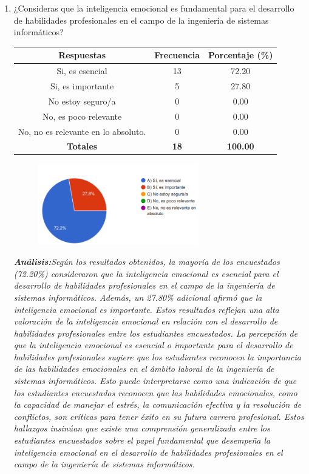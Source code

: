 \documentclass[journal]{IEEEtran}
\begin{document}
\begin{enumerate}
\item¿Consideras que la inteligencia emocional es fundamental para el desarrollo de habilidades profesionales en el campo de la ingeniería de sistemas informáticos?
	\begin{table}[H]
		\renewcommand{\arraystretch}{1.3}
		\centering
		\begin{tabular}{|c|c|c|}
			\hline
			\textbf{Respuestas} & \textbf{Frecuencia} & \textbf{Porcentaje (\%)}\\
			\hline
			Si, es esencial & 13 & 72.20 \\
			Si, es importante & 5 & 27.80 \\
			No estoy seguro/a & 0 & 0.00\\
			No, es poco relevante & 0 & 0.00\\
			No, no es relevante en lo absoluto. & 0 & 0.00\\
			\hline
			\textbf{Totales} &\textbf{18}& \textbf{100.00}\\
			\hline
		\end{tabular}
	\end{table}
	\begin{figure}[h]
		\centering
		\includegraphics[width=07cm]{Pregunta 4}
	\end{figure}
	\textit{\textbf{Análisis:}Según los resultados obtenidos, la mayoría de los encuestados (72.20\%) consideraron que la inteligencia emocional es esencial para el desarrollo de habilidades profesionales en el campo de la ingeniería de sistemas informáticos. Además, un 27.80\% adicional afirmó que la inteligencia emocional es importante. Estos resultados reflejan una alta valoración de la inteligencia emocional en relación con el desarrollo de habilidades profesionales entre los estudiantes encuestados.
La percepción de que la inteligencia emocional es esencial o importante para el desarrollo de habilidades profesionales sugiere que los estudiantes reconocen la importancia de las habilidades emocionales en el ámbito laboral de la ingeniería de sistemas informáticos. Esto puede interpretarse como una indicación de que los estudiantes encuestados reconocen que las habilidades emocionales, como la capacidad de manejar el estrés, la comunicación efectiva y la resolución de conflictos, son críticas para tener éxito en su futura carrera profesional.
Estos hallazgos insinúan que existe una comprensión generalizada entre los estudiantes encuestados sobre el papel fundamental que desempeña la inteligencia emocional en el desarrollo de habilidades profesionales en el campo de la ingeniería de sistemas informáticos.
}\\


\end{enumerate}
\end{document}
